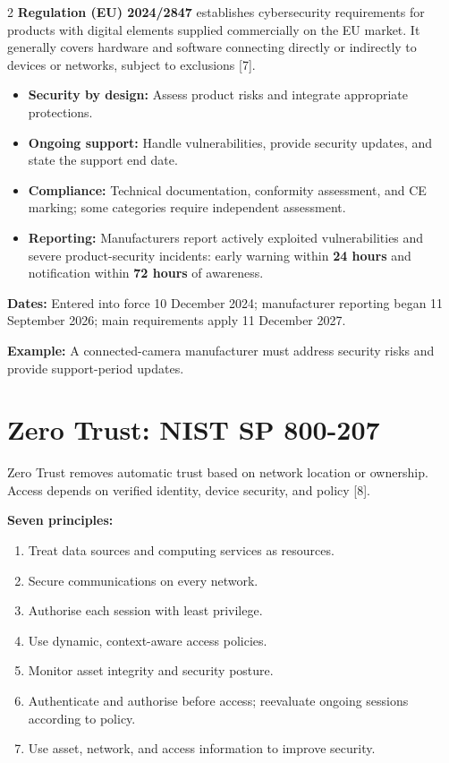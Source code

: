 \documentclass[11pt,a4paper]{article}
\begin{document}
\begin{multicols}{2}
\textbf{Regulation (EU) 2024/2847} establishes cybersecurity
requirements for products with digital elements supplied
commercially on the EU market. It generally covers hardware
and software connecting directly or indirectly to devices
or networks, subject to exclusions [7].
\begin{itemize}
\item \textbf{Security by design:} Assess product risks
and integrate appropriate protections.
\item \textbf{Ongoing support:} Handle vulnerabilities,
provide security updates, and state the support end date.
\item \textbf{Compliance:} Technical documentation,
conformity assessment, and CE marking; some categories
require independent assessment.
\item \textbf{Reporting:} Manufacturers report actively
exploited vulnerabilities and severe product-security
incidents: early warning within \textbf{24 hours} and
notification within \textbf{72 hours} of awareness.
\end{itemize}
\textbf{Dates:} Entered into force 10 December 2024;
manufacturer reporting began 11 September 2026;
main requirements apply 11 December 2027.

\textbf{Example:} A connected-camera manufacturer must
address security risks and provide support-period updates.

\columnbreak

\section{Zero Trust: NIST SP 800-207}

Zero Trust removes automatic trust based on network
location or ownership. Access depends on verified identity,
device security, and policy [8].

\textbf{Seven principles:}
\begin{enumerate}
\item Treat data sources and computing services as resources.
\item Secure communications on every network.
\item Authorise each session with least privilege.
\item Use dynamic, context-aware access policies.
\item Monitor asset integrity and security posture.
\item Authenticate and authorise before access;
reevaluate ongoing sessions according to policy.
\item Use asset, network, and access information to
improve security.
\end{enumerate}


\end{multicols}
\end{document}
